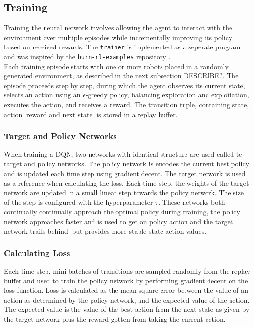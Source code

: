 \subsection{Training}
Training the neural network involves allowing the agent to interact with the environment over multiple episodes while incrementally improving its policy based on received rewards. The \texttt{trainer} is implemented as a seperate program and was inspired by the \texttt{burn-rl-examples} repository \cite{burn-rl-examples}. \\

Each training episode starts with one or more robots placed in a randomly generated environment, as described in the next subsection {\color{red}DESCRIBE?}. The episode proceeds step by step, during which the agent observes its current state, selects an action using an $\epsilon$-greedy policy, balancing exploration and exploitation, executes the action, and receives a reward. The transition tuple,  containing state, action, reward and next state, is stored in a replay buffer. \\

\subsubsection{Target and Policy Networks}
When training a DQN, two networks with identical structure are used called te target and policy networks. The policy network is encodes the current best policy and is updated each time step using gradient decent. The target network is used as a reference when calculating the loss. Each time step, the weights of the target network are updated in a small linear step towards the policy network. The size of the step is configured with the hyperparameter $\tau$. These networks both continually continually approach the optimal policy during training, the policy network approaches faster and is used to get on policy action and the target network trails behind, but provides more stable state action values.

\subsubsection{Calculating Loss}
Each time step, mini-batches of transitions are sampled randomly from the replay buffer and used to train the policy network by performing gradient decent on the loss function. Loss is calculated as the mean square error between the value of an action as determined by the policy network, and the expected value of the action. The expected value is the value of the best action from the next state as given by the target network plus the reward gotten from taking the current action. \\

